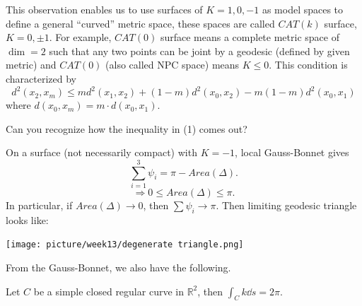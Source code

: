 \begin{enumerate}[(1)]
\begin{example}
    This observation enables us to use surfaces of \(K=1,0,-1\)
    as model spaces to define a general ``curved''  metric space,
    these spaces are called \(CAT(k)\) surface, \(K=0,\pm 1\).
    For example, \(CAT(0)\) surface means a complete metric space
    of \(\dim=2\) such that any two points can be joint by a geodesic
    (defined by given metric) and \(CAT(0)\) (also called NPC space)
    means \(K\le 0\). This condition is characterized by
    \[
        d^2(x_2,x_m)\le m d^2(x_1,x_2)+(1-m)d^2(x_0,x_2)-
        m(1-m)d^2(x_0,x_1)
        \tag{1}
    \]
    where \(d(x_0,x_m)=m \cdot d(x_0,x_1)\).
    \end{example}
    \begin{question}
        Can you recognize how the inequality in (1) comes out?
    \end{question}
    \begin{remark}
        On a surface (not necessarily compact) with \(K=-1\),
        local Gauss-Bonnet gives
        \[
            \sum_{i=1}^3\psi_i =\pi -Area(\Delta).    
        \]
        \[
          \Rightarrow 0\le Area(\Delta)\le \pi.  
        \]
        In particular, if \(Area(\Delta)\to 0\), then \(\sum \psi_i
        \to \pi\). Then limiting geodesic triangle looks like:
        \begin{center}
            \texttt{[image: picture/week13/degenerate 
            triangle.png]}
        \end{center}
    \end{remark}
    From the Gauss-Bonnet, we also have the following.
    \begin{corollary}
        Let \(C\) be a simple closed regular curve in \(\mathbb{R}^2\),
        then \(\int_C k\dd s=2\pi\).
    \end{corollary}
\end{enumerate}
